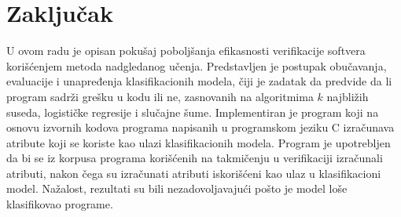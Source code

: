 \documentclass[12pt,oneside]{memoir}
\begin{document}








\chapter{Zaključak}
\label{chp:zaključak}

U ovom radu je opisan pokušaj poboljšanja efikasnosti verifikacije softvera korišćenjem metoda nadgledanog učenja. Predstavljen je postupak obučavanja, evaluacije i unapređenja klasifikacionih modela, čiji je zadatak da predvide da li program sadrži grešku u kodu ili ne, zasnovanih na algoritmima $k$ najbližih suseda, logističke regresije i slučajne šume. 
Implementiran je program koji na osnovu izvornih kodova programa napisanih u programskom jeziku C izračunava atribute koji se koriste kao ulazi klasifikacionih modela. Program je upotrebljen da bi se iz korpusa programa korišćenih na takmičenju u verifikaciji izračunali atributi, nakon čega su izračunati atributi iskorišćeni kao ulaz u klasifikacioni model. 
Nažalost, rezultati su bili nezadovoljavajući pošto je model loše klasifikovao programe.
\end{document}
